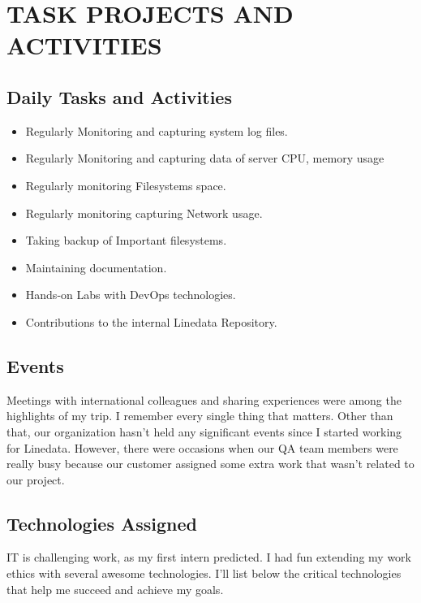 \chapter{TASK PROJECTS AND ACTIVITIES}


\section{Daily Tasks and Activities}
\begin{itemize}
  \item Regularly Monitoring and capturing system log files.
  \item Regularly Monitoring and capturing data of server CPU, memory usage
  \item Regularly monitoring Filesystems space.
  \item Regularly monitoring capturing Network usage.
  \item Taking backup of Important filesystems.
  \item Maintaining documentation.
  \item Hands-on Labs with DevOps technologies.
  \item Contributions to the internal Linedata Repository.

\end{itemize}

\section{Events}
 Meetings with international colleagues and sharing experiences were among the highlights of my trip. I remember every single thing that matters.
Other than that, our organization hasn't held any significant events since I started working for Linedata. However, there were occasions when our QA team members were really busy because our customer assigned some extra work that wasn't related to our project.



\section{Technologies Assigned}
IT is challenging work, as my first intern predicted. I had fun extending my work ethics with several awesome technologies. I'll list below the critical technologies that help me succeed and achieve my goals.

